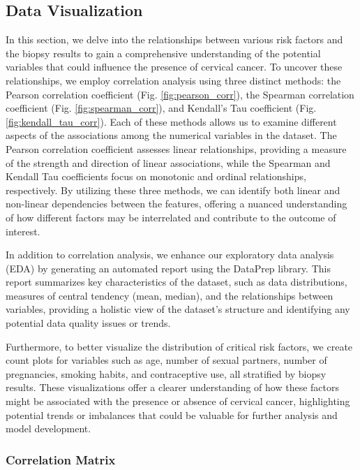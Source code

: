 \documentclass{llncs}
\begin{document}
\subsection{Data Visualization}

In this section, we delve into the relationships between various risk factors and the biopsy results to gain a comprehensive understanding of the potential variables that could influence the presence of cervical cancer. To uncover these relationships, we employ correlation analysis using three distinct methods: the Pearson correlation coefficient (Fig. \ref{fig:pearson_corr}), the Spearman correlation coefficient (Fig. \ref{fig:spearman_corr}), and Kendall's Tau coefficient (Fig. \ref{fig:kendall_tau_corr}). Each of these methods allows us to examine different aspects of the associations among the numerical variables in the dataset. The Pearson correlation coefficient assesses linear relationships, providing a measure of the strength and direction of linear associations, while the Spearman and Kendall Tau coefficients focus on monotonic and ordinal relationships, respectively. By utilizing these three methods, we can identify both linear and non-linear dependencies between the features, offering a nuanced understanding of how different factors may be interrelated and contribute to the outcome of interest.

In addition to correlation analysis, we enhance our exploratory data analysis (EDA) by generating an automated report using the DataPrep library. This report summarizes key characteristics of the dataset, such as data distributions, measures of central tendency (mean, median), and the relationships between variables, providing a holistic view of the dataset’s structure and identifying any potential data quality issues or trends.

Furthermore, to better visualize the distribution of critical risk factors, we create count plots for variables such as age, number of sexual partners, number of pregnancies, smoking habits, and contraceptive use, all stratified by biopsy results. These visualizations offer a clearer understanding of how these factors might be associated with the presence or absence of cervical cancer, highlighting potential trends or imbalances that could be valuable for further analysis and model development.

\subsubsection{Correlation Matrix}
\end{document}
